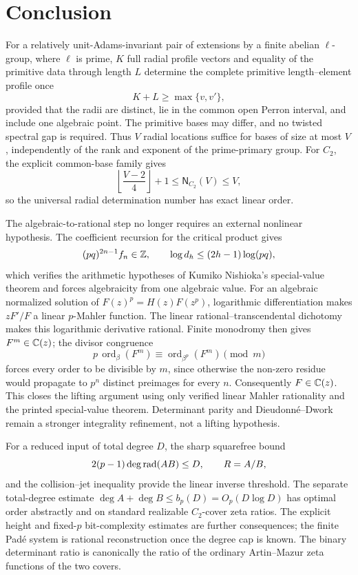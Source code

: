 \section{Conclusion}
\label{sec:conclusion}

For a relatively unit-Adams-invariant pair of extensions by a finite abelian
\(\ell\)-group, where \(\ell\) is prime, \(K\) full radial profile vectors
and equality of the primitive data through length \(L\) determine the
complete primitive length--element profile once
\[
 K+L\ge\max\{v,v'\},
\]
provided that the radii are distinct, lie in the common open Perron interval,
and include one algebraic point.  The primitive bases may differ, and no
twisted spectral gap is required.  Thus \(V\) radial locations suffice for
bases of size at most \(V\), independently of the rank and exponent of the
prime-primary group.  For \(C_2\), the explicit common-base family gives
\[
 \left\lfloor\frac{V-2}{4}\right\rfloor+1
 \le\mathsf N_{C_2}(V)\le V,
\]
so the universal radial determination number has exact linear order.

The algebraic-to-rational step no longer requires an external nonlinear
hypothesis.  The coefficient recursion for the critical product gives
\[
 (pq)^{2n-1}f_n\in\mathbb{Z},\qquad
 \log d_h\le(2h-1)\log(pq),
\]
which verifies the arithmetic hypotheses of Kumiko Nishioka's special-value
theorem and forces algebraicity from one algebraic value.  For an algebraic
normalized solution of \(F(z)^p=H(z)F(z^p)\), logarithmic differentiation
makes \(zF'/F\) a linear \(p\)-Mahler function.  The linear
rational--transcendental dichotomy makes this logarithmic derivative
rational.  Finite monodromy then gives \(F^m\in\mathbb{C}(z)\); the divisor
congruence
\[
 p\,\operatorname{ord}_\beta(F^m)
 \equiv\operatorname{ord}_{\beta^p}(F^m)\pmod m
\]
forces every order to be divisible by \(m\), since otherwise the non-zero
residue would propagate to \(p^n\) distinct preimages for every \(n\).
Consequently \(F\in\mathbb{C}(z)\).  This closes the lifting argument using only
verified linear Mahler rationality and the printed special-value theorem.
Determinant parity and Dieudonn\'e--Dwork remain a stronger integrality
refinement, not a lifting hypothesis.

For a reduced input of total degree \(D\), the sharp squarefree bound
\[
 2(p-1)\deg\operatorname{rad}(AB)\le D,\qquad R=A/B,
\]
and the collision--jet inequality provide the linear inverse threshold.  The
separate total-degree estimate
\(\deg A+\deg B\le b_p(D)=O_p(D\log D)\) has optimal order abstractly and on
standard realizable \(C_2\)-cover zeta ratios.  The explicit height and
fixed-\(p\) bit-complexity estimates are further consequences; the finite
Pad\'e system is rational reconstruction once the degree cap is known.  The
binary determinant ratio is canonically the ratio of the ordinary
Artin--Mazur zeta functions of the two covers.

